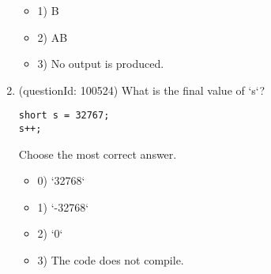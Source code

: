 \documentclass[12pt]{article}
\begin{document}
\begin{enumerate}[label=(\arabic*)]
\begin{itemize}
\item 1) B

\item 2) AB

\item 3) No output is produced.

\end{itemize}
\item (questionId: 100524) What is the final value of `s`?
\begin{verbatim}
short s = 32767;
s++;
\end{verbatim}
Choose the most correct answer. 
\begin{itemize}
\item 0) `32768`

\item 1) `-32768`

\item 2) `0`

\item 3) The code does not compile.

\end{itemize}

\end{enumerate}
\end{document}
